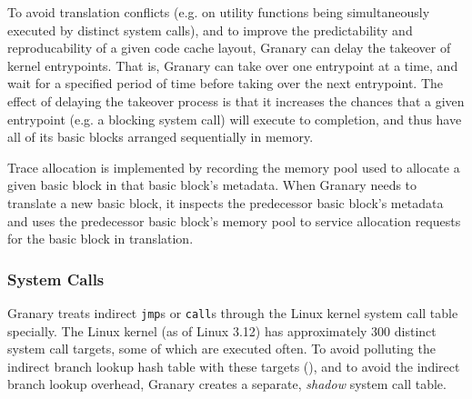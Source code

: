 \documentclass[preprint]{sigplanconf}
\begin{document}
To avoid translation conflicts (e.g. on utility functions being simultaneously executed by distinct system calls), and to improve the predictability and reproducability of a given code cache layout, Granary can delay the takeover of kernel entrypoints. That is, Granary can take over one entrypoint at a time, and wait for a specified period of time before taking over the next entrypoint. The effect of delaying the takeover process is that it increases the chances that a given entrypoint (e.g. a blocking system call) will execute to completion, and thus have all of its basic blocks  arranged sequentially in memory.

Trace allocation is implemented by recording the memory pool used to allocate a given basic block in that basic block's metadata. When Granary needs to translate a new basic block, it inspects the predecessor basic block's metadata and uses the predecessor basic block's memory pool to service allocation requests for the basic block in translation.


\subsubsection{System Calls}

Granary treats indirect \texttt{jmp}s or \texttt{call}s through the Linux kernel system call table specially. The Linux kernel (as of Linux 3.12) has approximately 300 distinct system call targets, some of which are executed often. To avoid polluting the indirect branch lookup hash table with these targets (), and to avoid the indirect branch lookup overhead, Granary creates a separate, \emph{shadow} system call table.
\end{document}
